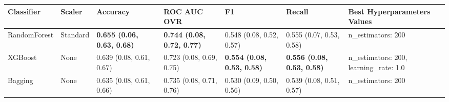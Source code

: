 \begin{tabular}{lllllll}
\toprule
Classifier & Scaler & Accuracy & ROC AUC OVR & F1 & Recall & Best Hyperparameters Values \\
\midrule
RandomForest & Standard & \textbf{0.655 (0.06, 0.63, 0.68)} & \textbf{0.744 (0.08, 0.72, 0.77)} & 0.548 (0.08, 0.52, 0.57) & 0.555 (0.07, 0.53, 0.58) & {{n\_estimators: 200}} \\
XGBoost & None & 0.639 (0.08, 0.61, 0.67) & 0.723 (0.08, 0.69, 0.75) & \textbf{0.554 (0.08, 0.53, 0.58)} & \textbf{0.556 (0.08, 0.53, 0.58)} & {{n\_estimators: 200, learning\_rate: 1.0}} \\
Bagging & None & 0.635 (0.08, 0.61, 0.66) & 0.735 (0.08, 0.71, 0.76) & 0.530 (0.09, 0.50, 0.56) & 0.539 (0.08, 0.51, 0.57) & {{n\_estimators: 200}} \\
\bottomrule
\end{tabular}
